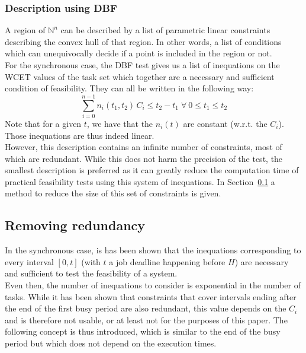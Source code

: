 \documentclass[times, 10pt,twocolumn, a4paper]{article}
\begin{document}

		\subsubsection{Description using DBF}
			\label{sct:cspaceDescr}

			A region of $\mathbb{N}^n$ can be described by a list of parametric linear
			constraints describing the convex hull of that region. In other words, a
			list of conditions which can unequivocally decide if a point is included in the region or not.\\

			For the synchronous case, the DBF test gives us a list of inequations
			on the WCET values of the task set which together are a necessary and
			sufficient condition of feasibility. They can all be written in the
			following way:
			\[
				\sum_{i=0}^{n-1} n_i(t_1, t_2) \, C_i \leq t_2 - t_1 \; \forall \: 0 \leq
				t_1 \leq t_2
			\]
			Note that for a given $t$, we have that the $n_i(t)$ are
			constant (w.r.t. the $C_i$). Those inequations are thus indeed linear.\\

			However, this description contains an infinite number of constraints, most of
			which are redundant. While this does not harm the precision of the
			test, the smallest description is preferred as it can greatly
			reduce the computation time of practical feasibility tests using this system
			of inequations. In Section~\ref{sct:removeRedundancy} a method to reduce the size of this set of constraints is given.
	
	\subsection{Removing redundancy}
		\label{sct:removeRedundancy}

	In the synchronous case, is has been shown that the inequations corresponding
	to every interval $[0, t]$ (with $t$ a job deadline happening before $H$) are
	necessary and sufficient to test the feasibility of a system.\\
	
	Even then, the number of inequations to consider is exponential in the number
	of tasks. While it has been shown that constraints that cover intervals ending
	after the end of the first busy period are also redundant, this value depends on the $C_i$ and is
	therefore not usable, or at least not for the purposes of this paper. The
	following concept is thus introduced, which is similar to the end of the busy period but which does not depend on the execution times.
	
\end{document}
